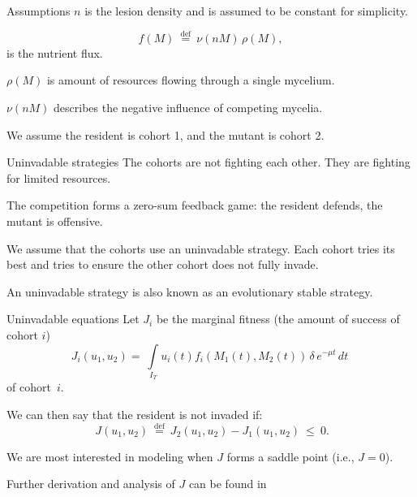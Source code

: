 \documentclass{beamer}
\begin{document}
\begin{frame}{Assumptions}
    $n$ is the lesion density and is assumed to be constant for simplicity. \newline\pause
    
    $$
    f(M) \: \stackrel{\mathrm{def}}{=} \: \nu(n M) \, \rho(M),
    $$
    is the nutrient flux. \newline
    
    $\rho(M)$ is amount of resources flowing through a single mycelium.
    
    $ \nu(n M) $ describes the negative influence of competing mycelia. \newline\pause
    
    We assume the resident is cohort 1, and the mutant is cohort 2.
\end{frame}

\begin{frame}{Uninvadable strategies}
    The cohorts are not fighting each other. They are fighting for limited resources. \newline\pause
    
    The competition forms a zero-sum feedback game: the resident defends, the mutant is offensive. \newline\pause
    
    We assume that the cohorts use an uninvadable strategy. Each cohort tries its best and tries to ensure the other cohort does not fully invade. \newline\pause
    
    An uninvadable strategy is also known as an evolutionary stable strategy.
\end{frame}


\begin{frame}{Uninvadable equations}
    Let $ J_i $ be the marginal fitness (the amount of success of cohort $i$)
    $$J_i(u_1, u_2) = \: \int\limits_{I_T} u_i(t) f_i(M_1(t), M_2(t)) \, \delta \, e^{-\mu t} \, dt \: $$ of cohort~$ i $. \newline\pause
    
    We can then say that the resident is not invaded if: $$ \: J(u_1, u_2) \: \stackrel{\mathrm{def}}{=} \: J_2(u_1, u_2) - J_1(u_1, u_2) \: \leqslant \: 0. $$ \pause
    
    We are most interested in modeling when $J$ forms a saddle point (i.e., $J = 0$).\newline
    
    Further derivation and analysis of $J$ can be found in \cite{YegorovGrognardMailleretHalkettBernhard2019}
    
\end{frame}
\end{document}
